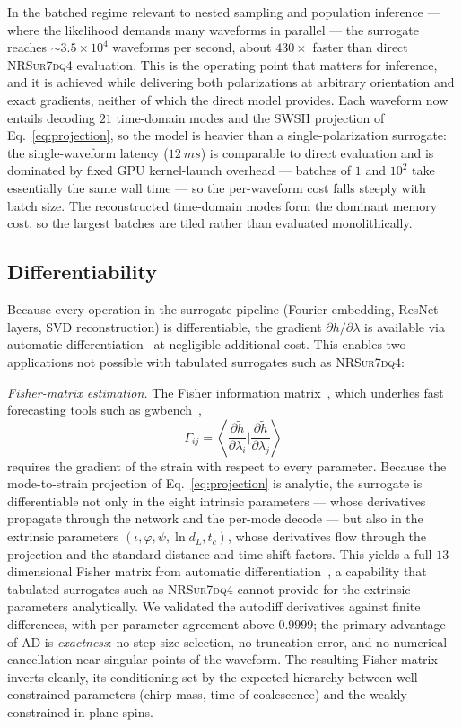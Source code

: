 \documentclass[aps,prd,twocolumn,superscriptaddress,longbibliography]{revtex4-2}
\newcommand{\NRSur}{\textsc{NRSur7dq4}}
\begin{document}
In the batched regime relevant to nested sampling and population inference ---
where the likelihood demands many waveforms in parallel --- the surrogate
reaches ${\sim}3.5\times10^4$ waveforms per second, about $430\times$ faster
than direct \NRSur{} evaluation. This is the operating point that matters for
inference, and it is achieved while delivering both polarizations at arbitrary
orientation and exact gradients, neither of which the direct model provides.
Each waveform now entails decoding $21$ time-domain modes and the SWSH
projection of Eq.~\eqref{eq:projection}, so the model is heavier than a
single-polarization surrogate: the single-waveform latency ($\SI{12}{ms}$) is
comparable to direct evaluation and is dominated by fixed GPU kernel-launch
overhead --- batches of $1$ and $10^2$ take essentially the same wall time ---
so the per-waveform cost falls steeply with batch size. The reconstructed
time-domain modes form the dominant memory cost, so the largest batches are
tiled rather than evaluated monolithically.

\subsection{Differentiability}
\label{sec:diff}

Because every operation in the surrogate pipeline
(Fourier embedding, ResNet layers, SVD reconstruction)
is differentiable, the gradient
$\partial\tilde{h}/\partial\lambda$
is available via automatic differentiation~\cite{Baydin:2018}
at negligible additional cost.
This enables two applications not possible with
tabulated surrogates such as \NRSur{}:

\textit{Fisher-matrix estimation.}
The Fisher information matrix~\cite{Cutler:1994pb,Poisson:1995ef},
which underlies fast forecasting tools such as
gwbench~\cite{Borhanian:2020},
\begin{equation}
  \Gamma_{ij} = \left\langle
    \frac{\partial\tilde{h}}{\partial\lambda_i}
    \Bigg|
    \frac{\partial\tilde{h}}{\partial\lambda_j}
  \right\rangle
\end{equation}
requires the gradient of the strain with respect to every parameter.
Because the mode-to-strain projection of Eq.~\eqref{eq:projection} is analytic,
the surrogate is differentiable not only in the eight intrinsic parameters ---
whose derivatives propagate through the network and the per-mode decode --- but
also in the extrinsic parameters $(\iota,\varphi,\psi,\ln d_L,t_c)$, whose
derivatives flow through the projection and the standard distance and
time-shift factors. This yields a full $13$-dimensional Fisher matrix from
automatic differentiation~\cite{Paszke:2019}, a capability that tabulated
surrogates such as \NRSur{} cannot provide for the extrinsic parameters
analytically. We validated the autodiff derivatives against finite differences,
with per-parameter agreement above $0.9999$; the primary advantage of AD is
\emph{exactness}: no step-size selection, no truncation error, and no numerical
cancellation near singular points of the waveform. The resulting Fisher matrix
inverts cleanly, its conditioning set by the expected hierarchy between
well-constrained parameters (chirp mass, time of coalescence) and the
weakly-constrained in-plane spins.
\end{document}
